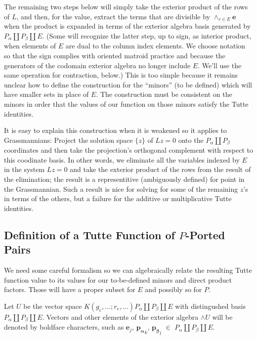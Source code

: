 \documentclass[Unicode]{cedram-alco}
\newcommand{\ext}[1]{\ensuremath{\mathbf{#1}}}
\newcommand{\dunion}{\coprod}
\begin{document}
The remaining two steps below will simply take the exterior product of the rows of $L$, and
then, for the value,
extract the terms that are divisible by $\wedge_{e \in E}\ext{e}$
when the product
is expanded in terms of the exterior algebra basis
generated by $P_\alpha \dunion P_\beta \dunion E$.
(Some will recognize the latter step, up to sign, as interior product, when elements
of $E$ are dual to the column index elements.  We choose notation
so that the sign complies with oriented matroid practice\cite{OMBOOK} and
because the generators of the codomain exterior algebra no longer include $E$.
We'll use the same operation for contraction, below.)
This is too simple because it remains unclear how to define the construction for the
``minors'' (to be defined) which will have smaller sets in place of $E$. The
construction must be consistent on the minors in order that the values
of our function on those minors satisfy the Tutte identities. 

It is easy to explain this construction when it is weakened
so it applies to Grassmannians:
Project the solution space $\{z\}$ of $Lz=0$ onto
the $P_\alpha\dunion P_\beta$ coordinates and then take the projection's orthogonal
complement with respect to this coodinate  basis.
In other words, we eliminate all the variables
indexed by $E$ in the system $Lz=0$ and take the exterior product of the rows
from the result of the elimination; the result is a 
representitive (ambiguously defined) for point in the Grassmannian.
Such a result is nice for solving for some of the remaining $z$'s in terms of
the others, but a failure
for the additive or multiplicative Tutte identities.


\subsection{Definition of a Tutte Function of $P$-Ported Pairs}


We need 
some careful formalism so we can algebraically relate the resulting Tutte function value
to its values for our to-be-defined minors and direct product factors.  Those 
will have a proper subset for $E$ and possibly so for $P$.

Let $U$ be the vector space $K(g_e,\ldots;r_e,\ldots)P_\alpha
\dunion P_\beta \dunion E$ with distingushed basis $P_\alpha
\dunion P_\beta \dunion E$.  Vectors and other elements of the
exterior algebra $\wedge U$ will be denoted by boldface
characters, such as $\ext{e}_j$, $\ext{p_\alpha}_k$,
$\ext{p_\beta}_l$ $\in$ $P_\alpha \dunion P_\beta \dunion E$.
    
\end{document}
